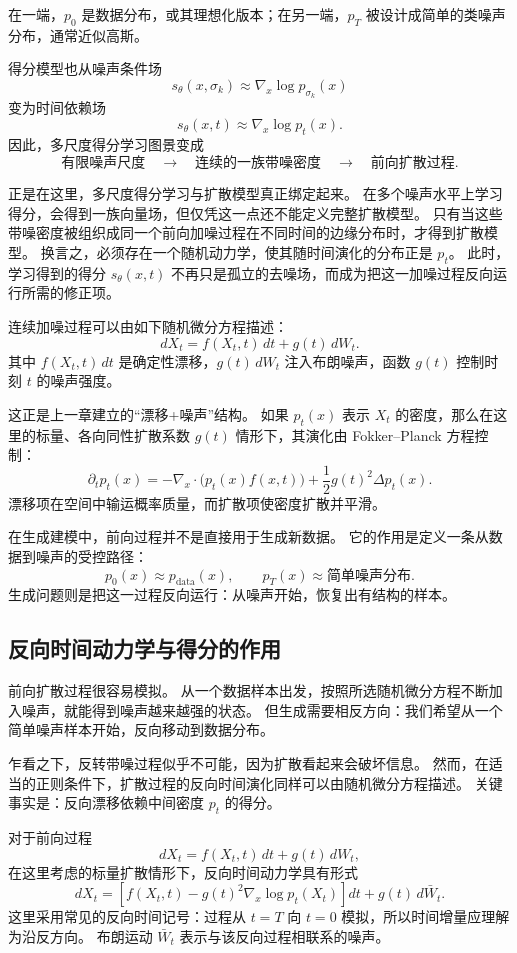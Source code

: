 在一端，$p_0$ 是数据分布，或其理想化版本；在另一端，$p_T$ 被设计成简单的类噪声分布，通常近似高斯。

得分模型也从噪声条件场
\[
s_\theta(x,\sigma_k)
\approx
\nabla_x\log p_{\sigma_k}(x)
\]
变为时间依赖场
\[
s_\theta(x,t)
\approx
\nabla_x\log p_t(x).
\]
因此，多尺度得分学习图景变成
\[
\text{有限噪声尺度}
\quad\longrightarrow\quad
\text{连续的一族带噪密度}
\quad\longrightarrow\quad
\text{前向扩散过程}.
\]

正是在这里，多尺度得分学习与扩散模型真正绑定起来。
在多个噪声水平上学习得分，会得到一族向量场，但仅凭这一点还不能定义完整扩散模型。
只有当这些带噪密度被组织成同一个前向加噪过程在不同时间的边缘分布时，才得到扩散模型。
换言之，必须存在一个随机动力学，使其随时间演化的分布正是 $p_t$。
此时，学习得到的得分 $s_\theta(x,t)$ 不再只是孤立的去噪场，而成为把这一加噪过程反向运行所需的修正项。

连续加噪过程可以由如下随机微分方程描述：
\[
\boxed{
dX_t
=
f(X_t,t)\,dt
+
g(t)\,dW_t.
}
\]
其中 $f(X_t,t)\,dt$ 是确定性漂移，$g(t)\,dW_t$ 注入布朗噪声，函数 $g(t)$ 控制时刻 $t$ 的噪声强度。

这正是上一章建立的“漂移+噪声”结构。
如果 $p_t(x)$ 表示 $X_t$ 的密度，那么在这里的标量、各向同性扩散系数 $g(t)$ 情形下，其演化由 Fokker--Planck 方程控制：
\[
\partial_t p_t(x)
=
-\nabla_x\cdot\bigl(p_t(x)f(x,t)\bigr)
+
\frac{1}{2}g(t)^2\Delta p_t(x).
\]
漂移项在空间中输运概率质量，而扩散项使密度扩散并平滑。

在生成建模中，前向过程并不是直接用于生成新数据。
它的作用是定义一条从数据到噪声的受控路径：
\[
p_0(x)
\approx
p_{\text{data}}(x),
\qquad
p_T(x)
\approx
\text{简单噪声分布}.
\]
生成问题则是把这一过程反向运行：从噪声开始，恢复出有结构的样本。

\subsection{反向时间动力学与得分的作用}

前向扩散过程很容易模拟。
从一个数据样本出发，按照所选随机微分方程不断加入噪声，就能得到噪声越来越强的状态。
但生成需要相反方向：我们希望从一个简单噪声样本开始，反向移动到数据分布。

乍看之下，反转带噪过程似乎不可能，因为扩散看起来会破坏信息。
然而，在适当的正则条件下，扩散过程的反向时间演化同样可以由随机微分方程描述。
关键事实是：反向漂移依赖中间密度 $p_t$ 的得分。

对于前向过程
\[
dX_t
=
f(X_t,t)\,dt
+
g(t)\,dW_t,
\]
在这里考虑的标量扩散情形下，反向时间动力学具有形式
\[
\boxed{
dX_t
=
\left[
f(X_t,t)
-
g(t)^2\nabla_x\log p_t(X_t)
\right]dt
+
g(t)\,d\bar{W}_t.
}
\]
这里采用常见的反向时间记号：过程从 $t=T$ 向 $t=0$ 模拟，所以时间增量应理解为沿反方向。
布朗运动 $\bar{W}_t$ 表示与该反向过程相联系的噪声。

